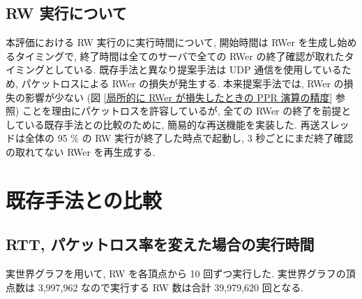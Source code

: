 \subsection{RW 実行について}

本評価における RW 実行のに実行時間について, 開始時間は RWer を生成し始めるタイミングで, 終了時間は全てのサーバで全ての RWer の終了確認が取れたタイミングとしている. 既存手法と異なり提案手法は UDP 通信を使用しているため, パケットロスによる RWer の損失が発生する. 本来提案手法では, RWer の損失の影響が少ない (図 \ref{局所的に RWer が損失したときの PPR 演算の精度} 参照) ことを理由にパケットロスを許容しているが, 全ての RWer の終了を前提としている既存手法との比較のために, 簡易的な再送機能を実装した. 再送スレッドは全体の 95 \% の RW 実行が終了した時点で起動し, 3 秒ごとにまだ終了確認の取れてない RWer を再生成する. 

\section{既存手法との比較}

\subsection{RTT, パケットロス率を変えた場合の実行時間}\label{RTT, パケットロス率を変えた場合の実行時間}

実世界グラフを用いて, RW を各頂点から 10 回ずつ実行した. 実世界グラフの頂点数は 3,997,962 なので実行する RW 数は合計 39,979,620 回となる.

